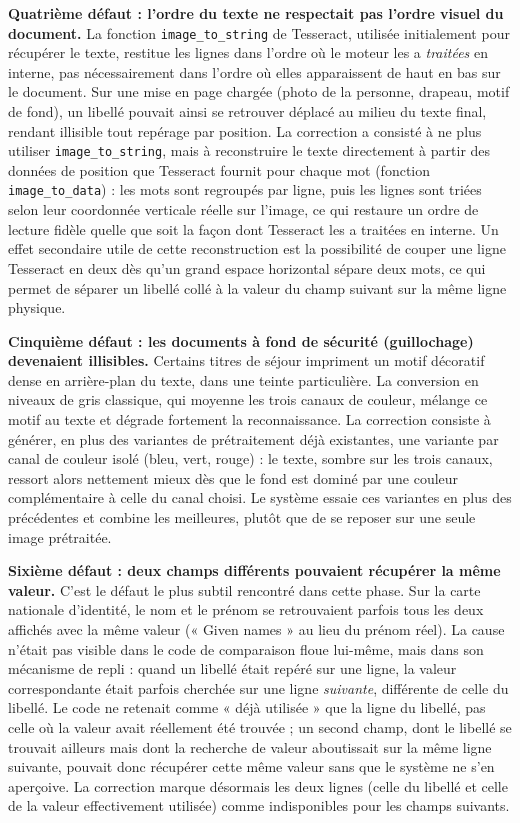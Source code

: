 \textbf{Quatrième défaut : l'ordre du texte ne respectait pas l'ordre visuel du document.} La fonction \texttt{image\_to\_string} de Tesseract, utilisée initialement pour récupérer le texte, restitue les lignes dans l'ordre où le moteur les a \emph{traitées} en interne, pas nécessairement dans l'ordre où elles apparaissent de haut en bas sur le document. Sur une mise en page chargée (photo de la personne, drapeau, motif de fond), un libellé pouvait ainsi se retrouver déplacé au milieu du texte final, rendant illisible tout repérage par position. La correction a consisté à ne plus utiliser \texttt{image\_to\_string}, mais à reconstruire le texte directement à partir des données de position que Tesseract fournit pour chaque mot (fonction \texttt{image\_to\_data}) : les mots sont regroupés par ligne, puis les lignes sont triées selon leur coordonnée verticale réelle sur l'image, ce qui restaure un ordre de lecture fidèle quelle que soit la façon dont Tesseract les a traitées en interne. Un effet secondaire utile de cette reconstruction est la possibilité de couper une ligne Tesseract en deux dès qu'un grand espace horizontal sépare deux mots, ce qui permet de séparer un libellé collé à la valeur du champ suivant sur la même ligne physique.

\textbf{Cinquième défaut : les documents à fond de sécurité (guillochage) devenaient illisibles.} Certains titres de séjour impriment un motif décoratif dense en arrière-plan du texte, dans une teinte particulière. La conversion en niveaux de gris classique, qui moyenne les trois canaux de couleur, mélange ce motif au texte et dégrade fortement la reconnaissance. La correction consiste à générer, en plus des variantes de prétraitement déjà existantes, une variante par canal de couleur isolé (bleu, vert, rouge) : le texte, sombre sur les trois canaux, ressort alors nettement mieux dès que le fond est dominé par une couleur complémentaire à celle du canal choisi. Le système essaie ces variantes en plus des précédentes et combine les meilleures, plutôt que de se reposer sur une seule image prétraitée.

\textbf{Sixième défaut : deux champs différents pouvaient récupérer la même valeur.} C'est le défaut le plus subtil rencontré dans cette phase. Sur la carte nationale d'identité, le nom et le prénom se retrouvaient parfois tous les deux affichés avec la même valeur (« Given names » au lieu du prénom réel). La cause n'était pas visible dans le code de comparaison floue lui-même, mais dans son mécanisme de repli : quand un libellé était repéré sur une ligne, la valeur correspondante était parfois cherchée sur une ligne \emph{suivante}, différente de celle du libellé. Le code ne retenait comme « déjà utilisée » que la ligne du libellé, pas celle où la valeur avait réellement été trouvée ; un second champ, dont le libellé se trouvait ailleurs mais dont la recherche de valeur aboutissait sur la même ligne suivante, pouvait donc récupérer cette même valeur sans que le système ne s'en aperçoive. La correction marque désormais les deux lignes (celle du libellé et celle de la valeur effectivement utilisée) comme indisponibles pour les champs suivants.

